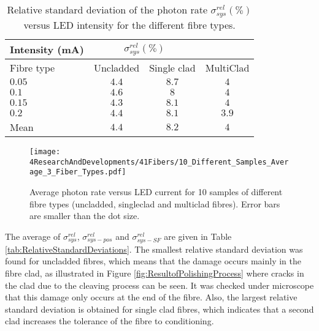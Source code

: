 \begin{table}[h]
\centering{}%
\begin{tabular}{lccc}
\toprule 
Intensity (mA) & \multicolumn{2}{c}{$\sigma^{rel}_{sys}(\%)$} \tabularnewline
\midrule
Fibre type & Uncladded & Single clad & MultiClad \tabularnewline
\midrule
\midrule
$0.05$ & $4.4$ & $8.7$ & $4$ \tabularnewline
$0.1$ & $4.6$ & $8$ & $4$ \tabularnewline
$0.15$ & $4.3$ & $8.1$ & $4$ \tabularnewline
$0.2$ & $4.4$ & $8.1$ & $3.9$ \tabularnewline
\midrule 
Mean & $4.4$ & $8.2$ & $4$ \tabularnewline
\bottomrule
\end{tabular}
\caption{Relative standard deviation of the photon rate $\sigma^{rel}_{sys}(\%)$ versus LED intensity for the different fibre types.}
\label{tab:RelativeStandardDeviation3FiberTypes}
\end{table}

\begin{figure}[h]
\centering
\texttt{[image: 4ResearchAndDevelopments/41Fibers/10\_Different\_Samples\_Average\_3\_Fiber\_Types.pdf]}
\caption{Average photon rate versus LED current for 10 samples of different fibre types (uncladded, singleclad and multiclad fibres). Error bars are smaller than the dot size.\label{fig:AveregeThreeFiberTypes}}
\end{figure}



The average of $\sigma^{rel}_{sys}$, $\sigma^{rel}_{sys-pos}$ and $\sigma^{rel}_{sys-SF}$ are given in Table \ref{tab:RelativeStandardDeviations}. The smallest relative standard deviation was found for uncladded fibres, which means that the damage occurs mainly in the fibre clad, as illustrated in Figure \ref{fig:ResultofPolishingProcess} where cracks in the clad due to the cleaving process can be seen. It was checked under microscope that this damage only occurs at the end of the fibre. Also, the largest relative standard deviation is obtained for single clad fibres, which indicates that a second clad increases the tolerance of the fibre to conditioning.

